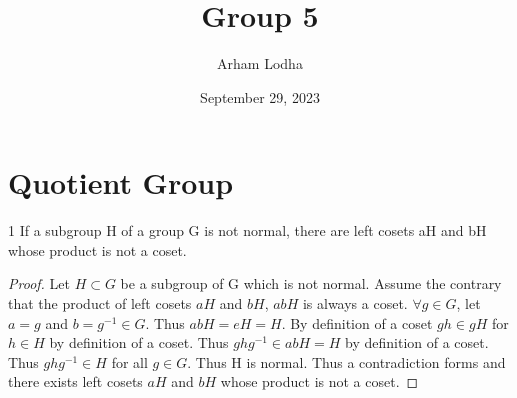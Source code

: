 \documentclass{article}
\begin{document}
\title{Group 5}
\author{Arham Lodha}%
\date{September 29, 2023}%
\maketitle


\section*{Quotient Group}

\begin{claim}{1}
    If a subgroup H of a group G is not normal, there are left cosets aH and bH whose product is not a coset.
\end{claim}
\begin{proof}
    Let $H \subset G$ be a subgroup of G which is not normal. Assume the contrary that the product of left cosets $aH$ and $bH$, $abH$ is always a coset. $\forall g \in G$, let $a = g$ and $b = g^{-1} \in G$. Thus $abH = eH = H$. By definition of a coset $gh \in gH$ for $h \in H$ by definition of a coset. Thus $ghg^{-1} \in abH = H$ by definition of a coset. Thus $ghg^{-1} \in H$ for all $g \in G$. Thus H is normal. Thus a contradiction forms and there exists left cosets $aH$ and $bH$ whose product is not a coset. 
\end{proof}

\bigskip
\end{document}
